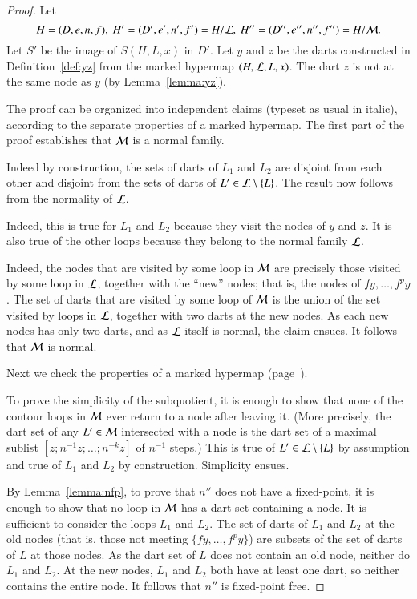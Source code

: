 \begin{proof} Let 
\[ 
H=(D,e,n,f),\   H' =(D',e',n',f') = H/{\cal
    L},\  H'' = (D'',e'',n'',f'') = H/{\cal M}.   
\] 
Let $S'$ be the image of $S(H,L,x)$ in $D'$.  Let $y$ and $z$ be the
darts constructed in Definition~\ref{def:yz} from the marked hypermap
$(H,{\cal L},L,x)$.  The dart $z$ is not at the same node as $y$ (by
Lemma~\ref{lemma:yz}).

The proof can be organized into independent claims (typeset as usual
in italic), according to the separate properties of a marked hypermap.
The first part of the proof establishes that ${\cal M}$ is a normal
family.


 
Indeed by construction, the sets of darts of $L_1$ and $L_2$ are
disjoint from each other and disjoint from the sets of darts of $L'\in
{\cal L}\setminus \{L\}$.  The result now follows from the normality
of ${\cal L}$.

   Indeed, this
is true for $L_1$ and $L_2$ because they visit the nodes of $y$ and
$z$.  It is also true of the other loops because they belong to the
normal family ${\cal L}$. 

  
Indeed, the nodes that are visited by some loop in ${\cal M}$ are
precisely those visited by some loop in ${\cal L}$, together with the
``new'' nodes; that is, the nodes of $f y,\ldots,f^p y$.  The set of
darts that are visited by some loop of ${\cal M}$ is the union of the
set visited by loops in ${\cal L}$, together with two darts at the
new nodes.  As each new nodes has only two darts, and as ${\cal L}$ itself
is normal, the claim ensues. It follows that ${\cal M}$ is normal.  

Next we check the properties of a marked hypermap (page~\pageref{def:marked}).

 To prove the simplicity of the subquotient, it is enough
to show that none of the contour loops in ${\cal M}$ ever return to a
node after leaving it.  (More precisely, the dart set of any
$L'\in{\cal M}$ intersected with a node is the dart set of a maximal
sublist $[z;n^{-1}z;\ldots;n^{-k}z]$ of $n^{-1}$ steps.)  This is true
of $L'\in{\cal L}\setminus\{L\}$ by assumption and true of $L_1$ and
$L_2$ by construction.  Simplicity ensues.

 By Lemma~\ref{lemma:nfp}, to prove that $n''$
does not have a fixed-point, it is enough to show that no loop in
${\cal M}$ has a dart set containing a node.  It is sufficient to
consider the loops $L_1$ and $L_2$.  The set of darts of $L_1$ and
$L_2$ at the old nodes (that is, those not meeting $\{f y,\ldots,f^p
y\}$) are subsets of the set of darts of $L$ at those nodes.  As the
dart set of $L$ does not contain an old node, neither do $L_1$ and
$L_2$.  At the new nodes, $L_1$ and $L_2$ both have at least one dart,
so neither contains the entire node.  It follows that $n''$ is
fixed-point free.


\end{proof}
